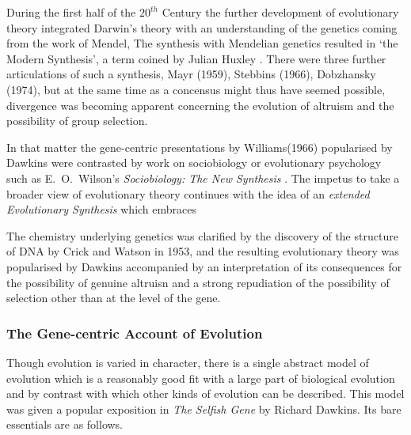 \documentclass[10pt,titlepage]{article}
\begin{document}
During the first half of the $20^{th}$ Century the further development of evolutionary theory integrated Darwin's theory with an understanding of the genetics coming from the work of Mendel,
The synthesis with Mendelian genetics resulted in `the Modern Synthesis', a term coined by Julian Huxley \cite{huxley-tms}.
There were three further articulations of such a synthesis, Mayr (1959), Stebbins (1966), Dobzhansky (1974), but at the same time as a concensus might thus have seemed possible, divergence was becoming apparent concerning the evolution of altruism and the possibility of group selection.

In that matter the gene-centric presentations by Williams(1966) \cite{williams-ans} popularised by Dawkins \cite{dawkinsSG} were contrasted by work on sociobiology or evolutionary psychology such as E.~O.~Wilson's \emph{Sociobiology: The New Synthesis} \cite{wilson-stns}.
The impetus to take a broader view of evolutionary theory continues with the idea of an \emph{extended Evolutionary Synthesis} which embraces 

The chemistry underlying genetics was clarified by the discovery of the structure of DNA by Crick and Watson in 1953, and the resulting evolutionary theory was popularised by Dawkins accompanied by an interpretation of its consequences for the possibility of genuine altruisn \cite{dawkins-tsg} and a strong repudiation of the possibility of selection other than at the level of the gene.

\subsubsection{The Gene-centric Account of Evolution}

Though evolution is varied in character, there is a single abstract model of evolution which is a reasonably good fit with a large part of biological evolution and by contrast with which other kinds of evolution can be described.
This model was given a popular exposition in \emph{The Selfish Gene}\cite{dawkinsSG} by Richard Dawkins.
Its bare essentials are as follows.
\end{document}
